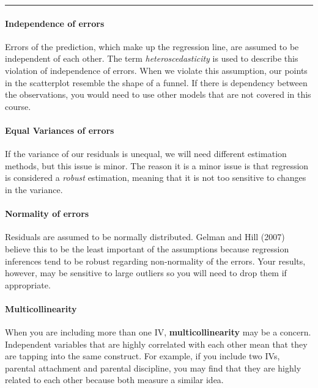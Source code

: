 \documentclass[
]{book}
\begin{document}
\begin{center}\rule{0.5\linewidth}{0.5pt}\end{center}

\hypertarget{independence-of-errors}{%
\paragraph{Independence of errors}\label{independence-of-errors}}

Errors of the prediction, which make up the regression line, are assumed to be independent of each other. The term \emph{heteroscedasticity} is used to describe this violation of independence of errors. When we violate this assumption, our points in the scatterplot resemble the shape of a funnel. If there is dependency between the observations, you would need to use other models that are not covered in this course.

\hypertarget{equal-variances-of-errors}{%
\paragraph{Equal Variances of errors}\label{equal-variances-of-errors}}

If the variance of our residuals is unequal, we will need different estimation methods, but this issue is minor. The reason it is a minor issue is that regression is considered a \emph{robust} estimation, meaning that it is not too sensitive to changes in the variance.

\hypertarget{normality-of-errors}{%
\paragraph{Normality of errors}\label{normality-of-errors}}

Residuals are assumed to be normally distributed. Gelman and Hill (2007) believe this to be the least important of the assumptions because regression inferences tend to be robust regarding non-normality of the errors. Your results, however, may be sensitive to large outliers so you will need to drop them if appropriate.

\hypertarget{multicollinearity}{%
\paragraph{Multicollinearity}\label{multicollinearity}}

When you are including more than one IV, \textbf{multicollinearity} may be a concern. Independent variables that are highly correlated with each other mean that they are tapping into the same construct. For example, if you include two IVs, parental attachment and parental discipline, you may find that they are highly related to each other because both measure a similar idea.
\end{document}
